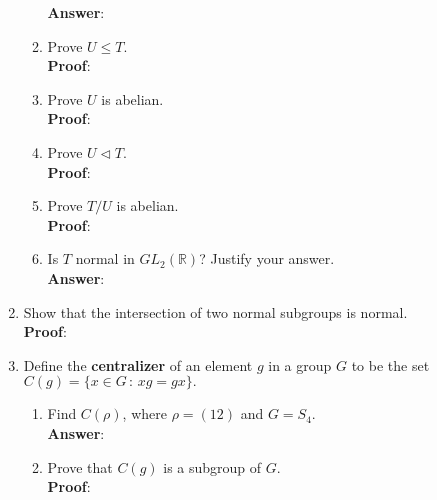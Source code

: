 \documentclass[12pt]{article}
\renewcommand{\emph}[1]{\textsf{\textbf{#1}}}
\newcommand{\bbR}{\mathbb{R}}
\begin{document}
\begin{enumerate}
\begin{enumerate}
	\textbf{Answer}:
	
	\vfill
	\item Prove $U \leq T.$\\
	\textbf{Proof}: \\
	\vfill
	\item Prove $U$ is abelian.\\
	\textbf{Proof}: \\
	\vfill
	\item Prove $U\lhd T.$\\
	\textbf{Proof}: \\
	\vfill
	\item Prove $T/U$ is abelian.\\
	\textbf{Proof}: \\
	\vfill
	\item Is $T$ normal in $GL_2(\bbR)$? Justify your answer.\\
	\textbf{Answer}: \\
	\vfill
	\end{enumerate}
\newpage
\item Show that the intersection of two normal subgroups is normal.\\
\textbf{Proof}: \\
	\vfill
\item Define the \emph{centralizer} of an element $g$ in a group $G$ to be the set $C(g)=\{x \in G \, : \, xg=gx\}.$
	\begin{enumerate}
	\item Find $C(\rho)$, where $\rho=(12)$ and $G=S_4.$\\
	\textbf{Answer}: \\
	\vfill
	\item Prove that $C(g)$ is a subgroup of $G.$\\
	\textbf{Proof}: \\
	\vfill
	 
	\end{enumerate}
\end{enumerate}
\end{document}

